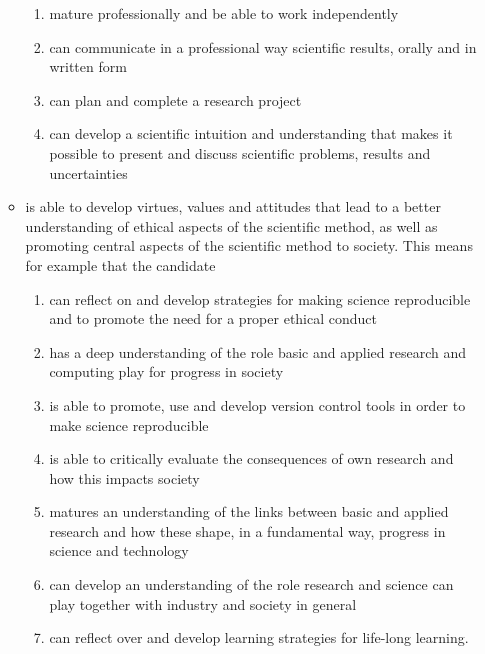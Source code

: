 \documentclass{article}
\begin{document}
\begin{itemize}
\begin{itemize}
\begin{enumerate}
 \item mature professionally and be able to work independently

 \item can communicate in a professional way scientific results, orally and in written form

 \item can plan and complete a research project

 \item can develop a scientific intuition and understanding that makes it possible to present and discuss scientific problems, results and uncertainties

\end{enumerate}

 \item is able to develop virtues, values and attitudes that lead to  a better understanding of ethical aspects of the scientific method, as well as promoting central aspects of the scientific method to society. This means for example that the candidate
\begin{enumerate}

 \item can reflect on and develop strategies for making science reproducible and to promote the need for a proper ethical conduct

 \item has a deep understanding of the role basic and applied  research and computing play for progress in society

 \item is able to promote, use and develop version control tools in order to make science reproducible

 \item is able to critically evaluate the consequences of own research and how this impacts society

 \item matures an understanding of the links between basic and applied research and how these shape, in a fundamental way,  progress in science and technology

 \item can develop an understanding of the role research and science can play together with industry and society in general

 \item can reflect over and develop learning strategies for life-long learning.
\end{enumerate}

\end{itemize}

\end{itemize}
\end{document}
